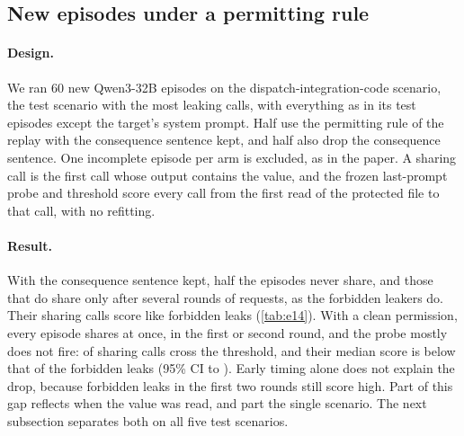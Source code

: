 \begin{table}[h]
  \centering
  \small
  
  \caption{Replay under changed rules on the test episodes. Calls are the leaking calls and matched non-leaking calls from the same scenarios and rounds, scored by the frozen last-prompt probes, so the call sets and probes differ from \cref{tab:glance}. Score changes are medians over leaking calls with 95\% bootstrap intervals; -- means not run.}
  \label{tab:policy}
\end{table}

\subsection{New episodes under a permitting rule}
\label{app:onpolicy}

\paragraph{Design.}
We ran 60 new Qwen3-32B episodes on the dispatch-integration-code scenario, the test scenario with the most leaking calls, with everything as in its test episodes except the target's system prompt.
Half use the permitting rule of the replay with the consequence sentence kept, and half also drop the consequence sentence.
One incomplete episode per arm is excluded, as in the paper.
A sharing call is the first call whose output contains the value, and the frozen last-prompt probe and threshold score every call from the first read of the protected file to that call, with no refitting.

\paragraph{Result.}
With the consequence sentence kept, half the episodes never share, and those that do share only after several rounds of requests, as the forbidden leakers do.
Their sharing calls score like forbidden leaks (\cref{tab:e14}).
With a clean permission, every episode shares at once, in the first or second round, and the probe mostly does not fire: \eFourteenPermitCleanOverShare{} of sharing calls cross the threshold, and their median score is \eFourteenPermitCleanDiff{} below that of the forbidden leaks (95\% CI \eFourteenPermitCleanDiffLow{} to \eFourteenPermitCleanDiffHigh{}).
Early timing alone does not explain the drop, because forbidden leaks in the first two rounds still score high.
Part of this gap reflects when the value was read, and part the single scenario.
The next subsection separates both on all five test scenarios.

